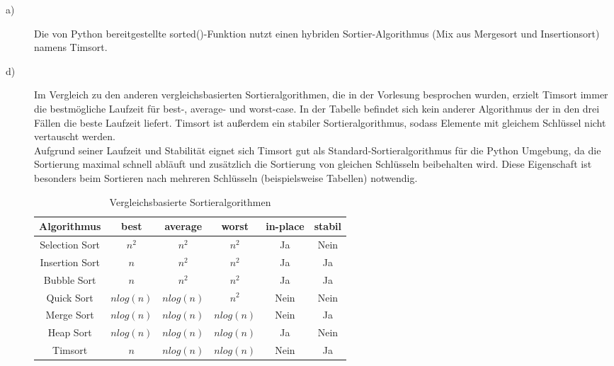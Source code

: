 \begin{description}
\item[a)] Die von Python bereitgestellte sorted()-Funktion nutzt einen hybriden Sortier-Algorithmus (Mix aus Mergesort und Insertionsort) namens Timsort.
\item[d)]
Im Vergleich zu den anderen vergleichsbasierten Sortieralgorithmen, die in der Vorlesung besprochen wurden, erzielt Timsort immer die bestmögliche Laufzeit für best-, average- und worst-case. In der Tabelle befindet sich kein anderer Algorithmus der in den drei Fällen die beste Laufzeit liefert. Timsort ist außerdem ein stabiler Sortieralgorithmus, sodass Elemente mit gleichem Schlüssel nicht vertauscht werden. \\
Aufgrund seiner Laufzeit und Stabilität eignet sich Timsort gut als Standard-Sortieralgorithmus für die Python Umgebung, da die Sortierung maximal schnell abläuft und zusätzlich die Sortierung von gleichen Schlüsseln beibehalten wird. Diese Eigenschaft ist besonders beim Sortieren nach mehreren Schlüsseln (beispielsweise Tabellen) notwendig.
\begin{table}[H]
\centering
\begin{tabular}{|c|c|c|c|c|c|}
\hline
Algorithmus & best & average & worst & in-place & stabil \\ \hline
Selection Sort & $n^2$ & $n^2$ & $n^2$ & Ja & Nein \\ \hline
Insertion Sort & $n$ &$ n^2$ &$ n^2$ & Ja & Ja \\ \hline
Bubble Sort & $n$ & $n^2$ & $n^2$ & Ja & Ja \\ \hline
Quick Sort & $n log(n)$ & $n log(n)$ & $n^2$ & Nein & Nein \\ \hline
Merge Sort & $n log(n)$ & $n log(n)$ & $n log(n)$ & Nein & Ja \\ \hline
Heap Sort & $n log(n)$ & $n log(n)$ & $n log(n)$ & Ja & Nein \\ \hline
Timsort & $n$ & $n log(n)$ & $n log(n)$ & Nein & Ja \\ \hline
\end{tabular}
\caption{Vergleichsbasierte Sortieralgorithmen}
\end{table}
\end{description}






